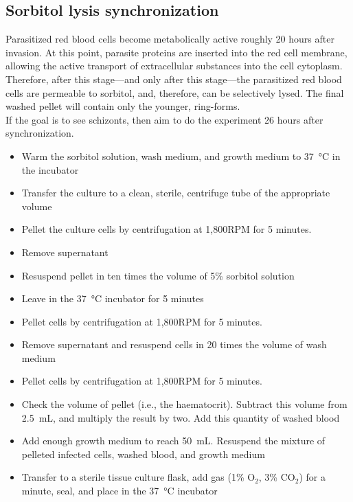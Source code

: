 \documentclass{article}
\begin{document}
\subsection{Sorbitol lysis synchronization}

Parasitized red blood cells become metabolically active roughly 20 hours after invasion. At this point, parasite proteins are inserted into the red cell membrane, allowing the active transport of extracellular substances into the cell cytoplasm. Therefore, after this stage---and only after this stage---the parasitized red blood cells are permeable to sorbitol, and, therefore, can be selectively lysed. The final washed pellet will contain only the younger, ring-forms.\\

If the goal is to see schizonts, then aim to do the experiment 26 hours after synchronization.\\

\begin{itemize}
	\item Warm the sorbitol solution, wash medium, and growth medium to \SI{37}{\celsius} in the incubator
	\item Transfer the culture to a clean, sterile, centrifuge tube of the appropriate volume
	\item Pellet the culture cells by centrifugation at 1,800RPM for 5 minutes.
	\item Remove supernatant
	\item Resuspend pellet in ten times the volume of 5\% sorbitol solution
	\item Leave in the \SI{37}{\celsius} incubator for 5 minutes
	\item Pellet cells by centrifugation at 1,800RPM for 5 minutes.
	\item Remove supernatant and resuspend cells in 20 times the volume of wash medium
	\item Pellet cells by centrifugation at 1,800RPM for 5 minutes.
	\item Check the volume of pellet (i.e., the haematocrit). Subtract this volume from \SI{2.5}{mL}, and multiply the result by two. Add this quantity of washed blood
	\item Add enough growth medium to reach \SI{50}{mL}. Resuspend the mixture of pelleted infected cells, washed blood, and growth medium
	\item Transfer to a sterile tissue culture flask, add gas (1\% O$_2$, 3\% CO$_2$) for a minute, seal, and place in the \SI{37}{\celsius} incubator
\end{itemize}
\end{document}
